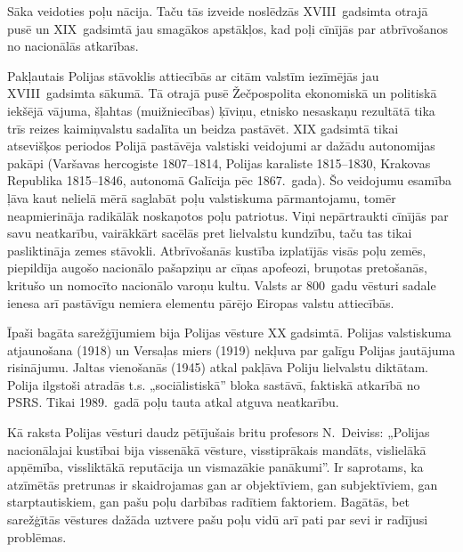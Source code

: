 \documentclass[twoside,a5paper,12pt,fleqn,openany]{extbook}
\begin{document}
Sāka veidoties poļu nācija. Taču tās izveide noslēdzās XVIII~gadsimta otrajā pusē un XIX~gadsimtā jau smagākos apstākļos, kad poļi cīnījās par atbrīvošanos no nacionālās atkarības.

Pakļautais Polijas stāvoklis attiecībās ar citām valstīm iezīmējās jau XVIII~gadsimta sākumā. Tā otrajā pusē Žečpospolita ekonomiskā un politiskā iekšējā vājuma, šļahtas (muižniecības) ķīviņu, etnisko nesaskaņu rezultātā tika trīs reizes kaimiņvalstu sadalīta un beidza pastāvēt. XIX gadsimtā tikai atsevišķos periodos Polijā pastāvēja valstiski veidojumi ar dažādu autonomijas pakāpi (Varšavas hercogiste 1807--1814, Polijas karaliste 1815--1830, Krakovas Republika 1815--1846, autonomā Galīcija pēc 1867.~gada). Šo veidojumu esamība ļāva kaut nelielā mērā saglabāt poļu valstiskuma pārmantojamu, tomēr neapmierināja radikālāk noskaņotos poļu patriotus. Viņi nepārtraukti cīnījās par savu neatkarību, vairākkārt sacēlās pret lielvalstu kundzību, taču tas tikai pasliktināja zemes stāvokli. Atbrīvošanās kustība izplatījās visās poļu zemēs, piepildīja augošo nacionālo pašapziņu ar cīņas apofeozi, bruņotas pretošanās, kritušo un nomocīto nacionālo varoņu kultu. Valsts ar 800~gadu vēsturi sadale ienesa arī pastāvīgu nemiera elementu pārējo Eiropas valstu attiecībās.

Īpaši bagāta sarežģījumiem bija Polijas vēsture XX gadsimtā. Polijas valstiskuma atjaunošana (1918) un Versaļas miers (1919) nekļuva par galīgu Polijas jautājuma risinājumu. Jaltas vienošanās (1945) atkal pakļāva Poliju lielvalstu diktātam. Polija ilgstoši atradās t.s. „sociālistiskā” bloka sastāvā, faktiskā atkarībā no PSRS. Tikai 1989.~gadā poļu tauta atkal atguva neatkarību.

Kā raksta Polijas vēsturi daudz pētījušais britu profesors N.~Deiviss: „Polijas nacionālajai kustībai bija vissenākā vēsture, visstiprākais mandāts, vislielākā apņēmība, vissliktākā reputācija un vismazākie panākumi”. Ir saprotams, ka atzīmētās pretrunas ir skaidrojamas gan ar objektīviem, gan subjektīviem, gan starptautiskiem, gan pašu poļu darbības radītiem faktoriem. Bagātās, bet sarežģītās vēstures dažāda uztvere pašu poļu vidū arī pati par sevi ir radījusi problēmas.
\end{document}
